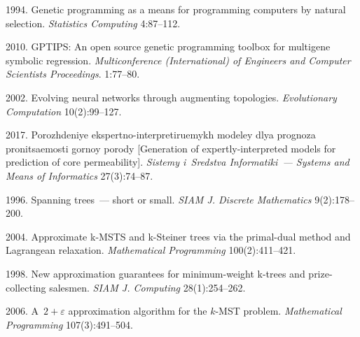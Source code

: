 \vspace*{6pt}

  \begin{multicols}{2}

\renewcommand{\bibname}{\protect\rmfamily References}

{\small\frenchspacing
 {%
 \begin{thebibliography}{99} 

 1994. Genetic programming as a means for programming computers by natural selection. \textit{Statistics Computing} 4:87--112.

 2010. GPTIPS: An open source genetic programming toolbox for multigene symbolic regression. 
 \textit{Multiconference (International) of Engineers and Computer Scientists Proceedings}. 1:77--80. 

 2002. Evolving neural networks through augmenting topologies. 
\textit{Evolutionary Computation} 10(2):99--127.

 2017. Po\-rozh\-de\-niye eks\-pert\-no-inter\-pre\-ti\-ru\-emykh mo\-de\-ley dlya prog\-no\-za pro\-ni\-tsa\-emosti gor\-noy po\-ro\-dy 
 [Generation of expertly-interpreted models for prediction of core permeability]. \textit{Sistemy i~Sredstva Informatiki~--- Systems and Means of Informatics}
  27(3):74--87.

 1996. Spanning trees~--- short or small. \textit{SIAM J. Discrete Mathematics} 9(2):178--200.

 2004. Approximate k-MSTS and k-Steiner trees via the primal-dual method and Lagrangean relaxation. 
 \textit{Mathematical Programming} 100(2):411--421.

 1998. New approximation guarantees for minimum-weight k-trees and prize-collecting salesmen.
 \textit{SIAM J. Computing} 28(1):254--262.

 2006. A~$2+\varepsilon$ approximation algorithm for the $k$-MST problem. 
\textit{Mathematical Programming} 107(3):491--504.


\end{thebibliography}}}
\end{multicols}
